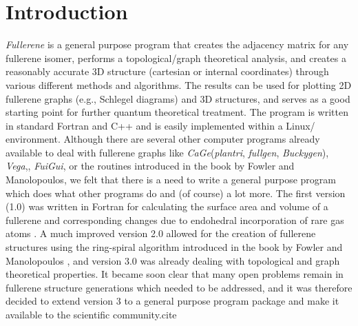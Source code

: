 \documentclass[article,a4paper,twoside]{memoir}
\let\acr=\textsmaller
\newcommand{\program}[1]{\textit{#1}}
\begin{document}
\section{Introduction}
\textit{Fullerene} is a general purpose program that creates the adjacency matrix
for any fullerene isomer, performs a topological/graph theoretical analysis, and
creates a reasonably accurate 3D structure (cartesian or internal coordinates) through
various different methods and algorithms. The results can be used for plotting 2D
fullerene graphs (e.g., Schlegel diagrams) and 3D structures, and serves as a good
starting point for further quantum theoretical treatment.  The program is written
in standard Fortran and C++ and is easily implemented within a Linux/\acr{UNIX}
environment.  Although there are several other computer programs already available
to deal with fullerene graphs like \program{CaGe}(\program{plantri},\cite{Brinkmann05}
\program{fullgen},\cite{Brinkmann} \program{Buckygen}\cite{Goedgebeur,Goedgebeur1}),\cite{Brinkmanx}
\program{Vega},\cite{Pisanski}, \program{FuiGui},\cite{FuiGui} or the routines introduced
in the book by Fowler and Manolopoulos,\cite{Atlas} we felt that there is a need
to write a general purpose program which does what other programs do and (of course)
a lot more.  The first version (1.0) was written in Fortran for calculating the
surface area and volume of a fullerene and corresponding changes due to endohedral
incorporation of rare gas atoms \cite{Tonner}.  A much improved version 2.0 allowed
for the creation of fullerene structures using the ring-spiral algorithm introduced
in the book by Fowler and Manolopoulos \cite{Atlas}, and version 3.0 was already
dealing with topological and graph theoretical properties.  It became soon clear
that many open problems remain in fullerene structure generations which needed to
be addressed,\cite{WIRE2015} and it was therefore decided to extend version 3 to a general purpose
program package and make it available to the scientific community.cite{}
\end{document}
